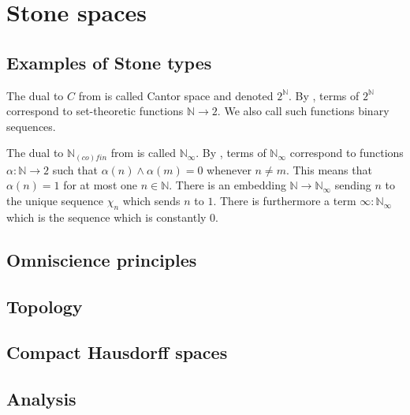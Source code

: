 \documentclass{../util/zariski-small}
\begin{document}
\section{Stone spaces}
\subsection{Examples of Stone types}
\begin{example}
  The dual to $C$ from  is called Cantor space 
  and denoted $2^\mathbb N$. 
  By , terms of $2^\mathbb N$ 
  correspond to set-theoretic functions $\mathbb N \to 2$. 
  We also call such functions binary sequences. 
\end{example}
\begin{example}
  The dual to $\mathbb N_{(co)fin}$ from  is called 
  $\mathbb N_\infty$. By , terms of $\mathbb N_\infty$ 
  correspond to functions $\alpha: \mathbb N \to 2$ such that $\alpha(n) \wedge \alpha(m) = 0$ 
  whenever $n \neq m$. This means that $\alpha(n) = 1$ for at most one $n\in\mathbb N$. 
  There is an embedding $\mathbb N \to \mathbb N_\infty$ sending $n$ to the unique sequence $\chi_n$
  which sends $n$ to $1$. 
  There is furthermore a term $\infty:\mathbb N_\infty$ which is the sequence which is constantly $0$. 
\end{example}

\subsection{Omniscience principles}



\subsection{Topology}

\subsection{Compact Hausdorff spaces}
\subsection{Analysis}


%
\end{document}
